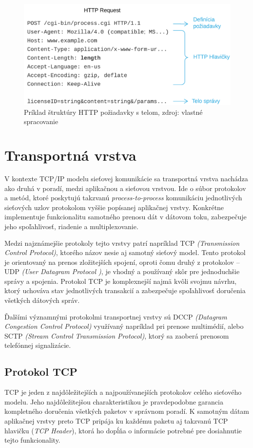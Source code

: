 \documentclass[
  digital, %
  table,   %
  lof,     %
  nolot,   %
  nocover
]{fithesis3}
\begin{document}
\begin{figure}[h]
  \centering
    \includegraphics[width=.97\textwidth]{images/net-http.png}
  \caption{Príklad štruktúry HTTP požiadavky s telom, zdroj: vlastné spracovanie}
  \label{fig:net-http}
\end{figure}

\section{Transportná vrstva}
V kontexte TCP/IP modelu sieťovej komunikácie sa transportná vrstva nachádza
ako druhá v poradí, medzi aplikačnou a sieťovou vrstvou. Ide o súbor protokolov
a metód, ktoré poskytujú takzvanú \textit{process-to-process} komunikáciu
jednotlivých sieťových uzlov protokolom vyššie popísanej aplikačnej vrstvy.
Konkrétne implementuje funkcionalitu samotného prenosu dát v dátovom toku,
zabezpečuje jeho spoľahlivosť, riadenie a multiplexovanie. 

Medzi najznámejšie protokoly tejto vrstvy patrí napríklad TCP
\textit{(Transmission Control Protocol)}, ktorého názov nesie aj samotný
sieťový model. Tento protokol je orientovaný na prenos zložitejších spojení,
oproti čomu druhý z protokolov -- UDP \textit{(User Datagram Protocol )}, je
vhodný a používaný skôr pre jednoduchšie správy a spojenia. Protokol TCP je
komplexnejší najmä kvôli svojmu návrhu, ktorý uchováva stav jednotlivých
transakcií a zabezpečuje spoľahlivosť doručenia všetkých dátových správ. 

Ďalšími
významnými protokolmi transportnej vrstvy sú DCCP
\textit{(Datagram Congestion Control Protocol)} využívaný napríklad pri prenose
multimédií, alebo SCTP \textit{(Stream Control Transmission Protocol)}, ktorý
sa zaoberá prenosom telefónnej signalizácie.

\subsection{Protokol TCP}
TCP je jeden z najdôležitejších a najpoužívanejších protokolov celého sieťového
modelu. Jeho najdôležitejšou charakteristikou je
pravdepodobne garancia kompletného doručenia všetkých paketov v správnom
poradí. K samotným dátam aplikačnej vrstvy preto TCP pripája ku každému paketu
aj takzvanú TCP hlavičku (\textit{TCP Header}), ktorá ho dopĺňa o informácie
potrebné pre dosiahnutie tejto funkcionality.
\end{document}
